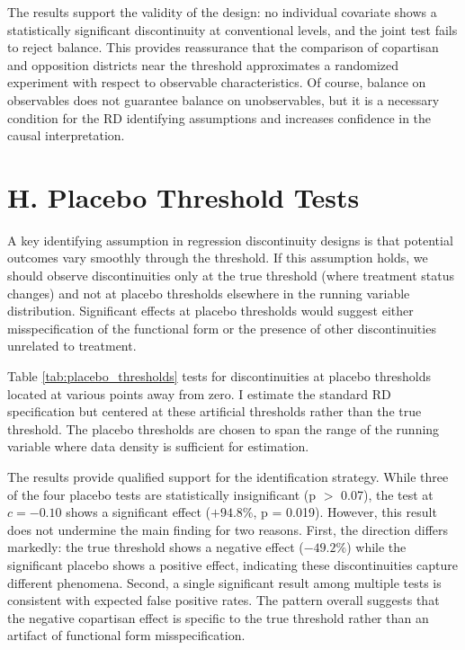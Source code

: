 \documentclass[12pt,letterpaper,oneside]{book}
\newcommand{\basepath}{g:/My Drive/Grad School}
\newcommand{\basepath}{basepath}
\begin{document}
The results support the validity of the design: no individual covariate shows a statistically significant discontinuity at conventional levels, and the joint test fails to reject balance. This provides reassurance that the comparison of copartisan and opposition districts near the threshold approximates a randomized experiment with respect to observable characteristics. Of course, balance on observables does not guarantee balance on unobservables, but it is a necessary condition for the RD identifying assumptions and increases confidence in the causal interpretation.


\label{tab:balance_full}

\section*{H. Placebo Threshold Tests}

A key identifying assumption in regression discontinuity designs is that potential outcomes vary smoothly through the threshold. If this assumption holds, we should observe discontinuities only at the true threshold (where treatment status changes) and not at placebo thresholds elsewhere in the running variable distribution. Significant effects at placebo thresholds would suggest either misspecification of the functional form or the presence of other discontinuities unrelated to treatment.

Table \ref{tab:placebo_thresholds} tests for discontinuities at placebo thresholds located at various points away from zero. I estimate the standard RD specification but centered at these artificial thresholds rather than the true threshold. The placebo thresholds are chosen to span the range of the running variable where data density is sufficient for estimation.

The results provide qualified support for the identification strategy. While three of the four placebo tests are statistically insignificant (p $>$ 0.07), the test at $c = -0.10$ shows a significant effect ($+94.8\%$, p = 0.019). However, this result does not undermine the main finding for two reasons. First, the direction differs markedly: the true threshold shows a negative effect ($-49.2\%$) while the significant placebo shows a positive effect, indicating these discontinuities capture different phenomena. Second, a single significant result among multiple tests is consistent with expected false positive rates. The pattern overall suggests that the negative copartisan effect is specific to the true threshold rather than an artifact of functional form misspecification.
\end{document}
